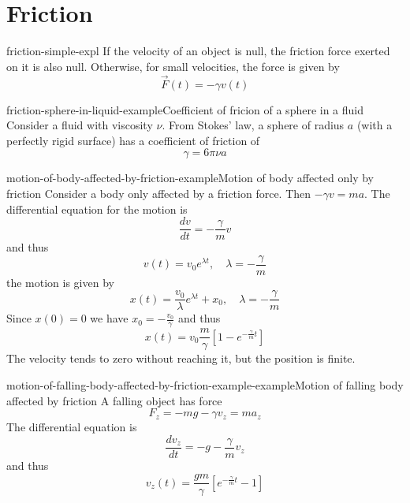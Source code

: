 \documentclass[preview]{standalone}
\begin{document}
\genpage

\section{Friction}

\begin{snippet}{friction-simple-expl}
    If the velocity of an object is null, the friction force exerted on it is also null.
    Otherwise, for small velocities, the force is given by
    \[
        \vec{F}(t) = -\gamma v(t)
    \]
\end{snippet}

\begin{snippetexample}{friction-sphere-in-liquid-example}{Coefficient of fricion of a sphere in a fluid}
    Consider a fluid with viscosity \(\nu\). From Stokes' law, a sphere of radius \(a\) (with a perfectly
    rigid surface) has a coefficient of friction of
    \[
        \gamma = 6\pi\nu a
    \]
\end{snippetexample}

\begin{snippetexample}{motion-of-body-affected-by-friction-example}{Motion of body affected only by friction}
    Consider a body only affected by a friction force. Then \(-\gamma v = ma\).
    The differential equation for the motion is
    \[
        \frac{dv}{dt} = -\frac{\gamma}{m}v
    \]
    and thus
    \[
        v(t) = v_0e^{\lambda t}, \quad \lambda = -\frac{\gamma}{m}
    \]
    the motion is given by
    \[
        x(t) = \frac{v_0}{\lambda}e^{\lambda t} + x_0, \quad \lambda = -\frac{\gamma}{m}
    \]
    Since \(x(0)=0\) we have \(x_0 = -\frac{v_0}{\gamma}\) and thus
    \[
        x(t) = v_0 \frac{m}{\gamma}\left[1 - e^{-\frac{\gamma}{m}t}\right]
    \]
    The velocity tends to zero without reaching it, but the position is finite.
\end{snippetexample}

\begin{snippetexample}{motion-of-falling-body-affected-by-friction-example-example}{Motion of falling body affected by friction}
    A falling object has force
    \[
        F_z = -mg - \gamma v_z = ma_z
    \]
    The differential equation is
    \[
        \frac{dv_z}{dt} = -g-\frac{\gamma}{m}v_z
    \]
    and thus
    \[
        v_z(t) = \frac{gm}{\gamma}\left[
            e^{-\frac{\gamma}{m}t} - 1
        \right]
    \]
\end{snippetexample}
\end{document}
